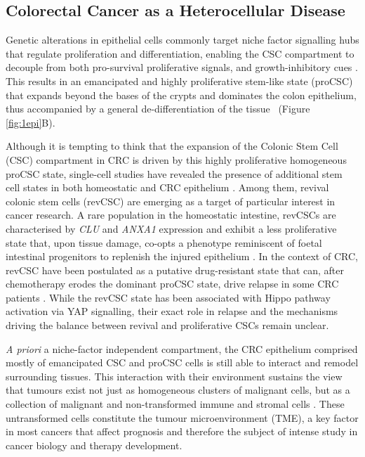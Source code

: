 \subsection{Colorectal Cancer as a Heterocellular Disease}

Genetic alterations in epithelial cells commonly target niche factor signalling hubs that regulate proliferation and differentiation, enabling the CSC compartment to decouple from both pro-survival proliferative signals, and growth-inhibitory cues \cite{sphyris_subversion_2021}. This results in an emancipated and highly proliferative stem-like state (proCSC) that expands beyond the bases of the crypts and dominates the colon epithelium, thus accompanied by a general de-differentiation of the tissue~\cite{van_de_wetering_-catenintcf-4_2002} (Figure \ref{fig:1epi}B).

Although it is tempting to think that the expansion of the Colonic Stem Cell (CSC) compartment in CRC is driven by this highly proliferative homogeneous proCSC state, single-cell studies have revealed the presence of additional stem cell states in both homeostatic and CRC epithelium \cite{norkin_single-cell_2020, bankaitis_reserve_2018,barriga_mex3a_2017,bues_deterministic_2022}.
Among them, revival colonic stem cells (revCSC) are emerging as a target of particular interest in cancer research. A rare population in the homeostatic intestine, revCSCs are characterised by \emph{CLU} and \emph{ANXA1} expression and exhibit a less proliferative state that, upon tissue damage, co-opts a phenotype reminiscent of foetal intestinal progenitors to replenish the injured epithelium \cite{ayyaz_single-cell_2019}. 
In the context of CRC, revCSC have been postulated as a putative drug-resistant state that can, after chemotherapy erodes the dominant proCSC state, drive relapse in some CRC patients \cite{rehman_colorectal_2021,alvarez-varela_mex3a_2022}. While the revCSC state has been associated with Hippo pathway activation via YAP signalling, their exact role in relapse and the mechanisms driving the balance between revival and proliferative CSCs remain unclear.

\emph{A priori} a niche-factor independent compartment, the CRC epithelium comprised mostly of emancipated CSC and proCSC cells is still able to interact and remodel surrounding tissues. This interaction with their environment sustains the view that tumours exist not just as homogeneous clusters of malignant cells, but as a collection of malignant and non-transformed immune and stromal cells \cite{balkwill_tumor_2012}. These untransformed cells constitute the tumour microenvironment (TME), a key factor in most cancers that affect prognosis \cite{calon_stromal_2015} and therefore the subject of intense study in cancer biology and therapy development. 


